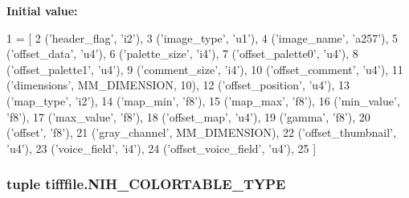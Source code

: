 {\bfseries Initial value\-:}
\begin{DoxyCode}
1 = [
2     (\textcolor{stringliteral}{'header\_flag'}, \textcolor{stringliteral}{'i2'}),
3     (\textcolor{stringliteral}{'image\_type'}, \textcolor{stringliteral}{'u1'}),
4     (\textcolor{stringliteral}{'image\_name'}, \textcolor{stringliteral}{'a257'}),
5     (\textcolor{stringliteral}{'offset\_data'}, \textcolor{stringliteral}{'u4'}),
6     (\textcolor{stringliteral}{'palette\_size'}, \textcolor{stringliteral}{'i4'}),
7     (\textcolor{stringliteral}{'offset\_palette0'}, \textcolor{stringliteral}{'u4'}),
8     (\textcolor{stringliteral}{'offset\_palette1'}, \textcolor{stringliteral}{'u4'}),
9     (\textcolor{stringliteral}{'comment\_size'}, \textcolor{stringliteral}{'i4'}),
10     (\textcolor{stringliteral}{'offset\_comment'}, \textcolor{stringliteral}{'u4'}),
11     (\textcolor{stringliteral}{'dimensions'}, MM\_DIMENSION, 10),
12     (\textcolor{stringliteral}{'offset\_position'}, \textcolor{stringliteral}{'u4'}),
13     (\textcolor{stringliteral}{'map\_type'}, \textcolor{stringliteral}{'i2'}),
14     (\textcolor{stringliteral}{'map\_min'}, \textcolor{stringliteral}{'f8'}),
15     (\textcolor{stringliteral}{'map\_max'}, \textcolor{stringliteral}{'f8'}),
16     (\textcolor{stringliteral}{'min\_value'}, \textcolor{stringliteral}{'f8'}),
17     (\textcolor{stringliteral}{'max\_value'}, \textcolor{stringliteral}{'f8'}),
18     (\textcolor{stringliteral}{'offset\_map'}, \textcolor{stringliteral}{'u4'}),
19     (\textcolor{stringliteral}{'gamma'}, \textcolor{stringliteral}{'f8'}),
20     (\textcolor{stringliteral}{'offset'}, \textcolor{stringliteral}{'f8'}),
21     (\textcolor{stringliteral}{'gray\_channel'}, MM\_DIMENSION),
22     (\textcolor{stringliteral}{'offset\_thumbnail'}, \textcolor{stringliteral}{'u4'}),
23     (\textcolor{stringliteral}{'voice\_field'}, \textcolor{stringliteral}{'i4'}),
24     (\textcolor{stringliteral}{'offset\_voice\_field'}, \textcolor{stringliteral}{'u4'}),
25 ]
\end{DoxyCode}
\hypertarget{namespacetifffile_abe1a6d366c3be01c66a3c9e876a6eec7}{
\subsubsection[{N\-I\-H\-\_\-\-C\-O\-L\-O\-R\-T\-A\-B\-L\-E\-\_\-\-T\-Y\-P\-E}]{\setlength{\rightskip}{0pt plus 5cm}tuple tifffile.\-N\-I\-H\-\_\-\-C\-O\-L\-O\-R\-T\-A\-B\-L\-E\-\_\-\-T\-Y\-P\-E}}\label{namespacetifffile_abe1a6d366c3be01c66a3c9e876a6eec7}
